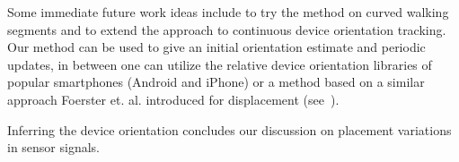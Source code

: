 Some immediate future work ideas include to try the method on curved walking segments and to extend the approach to continuous device orientation 
tracking. Our method can be used to give an initial orientation estimate and periodic updates, in between one can utilize the relative device orientation libraries of popular smartphones (Android and iPhone) or a method based on a similar approach Foerster et. al. introduced for displacement (see~\cite{Forster1}).

Inferring the device orientation concludes our discussion on placement variations in sensor signals.


 
